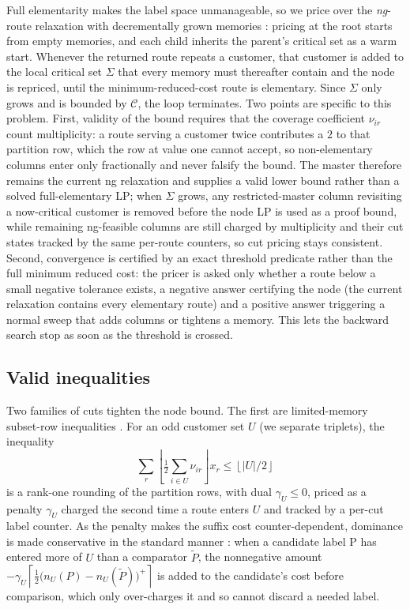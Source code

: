 \documentclass[review,3p,authoryear]{elsarticle}
\theoremstyle{plain}
\theoremstyle{definition}
\theoremstyle{remark}
\newcommand{\C}{\mathcal{C}}
\begin{document}
Full elementarity makes the label space unmanageable, so we price over the
\emph{ng}-route relaxation with decrementally grown memories
\citep{Baldacci2011,RighiniSalani2006}: pricing at the root starts from empty memories,
and each child inherits the parent's critical set as a warm start. Whenever the returned
route repeats a customer, that customer is added to the local
critical set $\Sigma$ that every memory must thereafter contain and the node is
repriced, until the minimum-reduced-cost route is elementary. Since $\Sigma$ only grows
and is bounded by $\C$, the loop terminates. Two points are specific to this problem.
First, validity of the bound requires
that the coverage coefficient $\nu_{ir}$ count multiplicity: a route serving a
customer twice contributes a $2$ to that partition row, which the row at value one
cannot accept, so non-elementary columns enter only fractionally and never falsify the
bound. The master therefore remains the current ng relaxation and supplies a valid lower
bound rather than a solved full-elementary LP; when $\Sigma$ grows, any restricted-master
column revisiting a now-critical customer is removed before the node LP is used as a
proof bound, while remaining ng-feasible columns are still charged by multiplicity and
their cut states tracked by the same per-route counters, so cut pricing stays consistent.
Second, convergence is certified by an exact threshold predicate rather than the full
minimum reduced cost: the pricer is asked only whether a route below a small negative
tolerance exists, a negative answer certifying the node (the current relaxation contains
every elementary route) and a positive answer triggering a normal sweep that adds columns
or tightens a memory. This lets the backward search stop as soon as the threshold is
crossed.

\subsection{Valid inequalities}
\label{sec:cuts}

Two families of cuts tighten the node bound. The first are limited-memory subset-row
inequalities \citep{Jepsen2008,Pecin2017}. For an odd customer set $U$ (we separate
triplets), the inequality
\[
\sum_{r}\left\lfloor\tfrac12\sum_{i\in U}\nu_{ir}\right\rfloor x_r
\le \left\lfloor |U|/2\right\rfloor
\]
is a rank-one rounding of the partition rows, with dual $\gamma_U\le0$, priced as a
penalty $\gamma_U$ charged the second time a route enters $U$ and tracked by a per-cut
label counter. As the penalty makes the suffix cost counter-dependent, dominance is made
conservative in the standard manner \citep{Jepsen2008}: when a candidate label
P has entered more of $U$ than a comparator \(\tilde{P}\), the
nonnegative amount $ -\gamma_U\left\lceil\tfrac12
\bigl(n_U(P)-n_U(\tilde{P})\bigr)^+\right\rceil $
is added to the candidate's cost before comparison, which only over-charges it and so
cannot discard a needed label.
\end{document}
